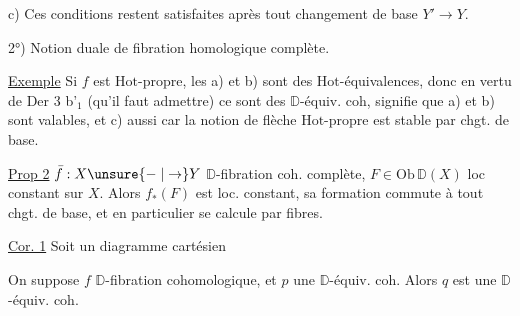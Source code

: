 
c) Ces conditions restent satisfaites après tout changement de base $Y'\to Y$.

2°) Notion duale de fibration homologique complète.

\uline{Exemple} Si $f$ est $\mathrm{Hot}$-propre, les  a) et b) sont des $\mathrm{Hot}$-équivalences, donc en vertu de Der 3 b'$_1$ (qu'il faut admettre) ce sont des $\mathbb D$-équiv. coh,  signifie que a) et b) sont valables, et c) aussi car la notion de flèche $\mathrm{Hot}$-propre est stable par chgt. de base.

\uline{Prop 2}  $\bar f:X\unsure{\relbar|\to}Y$ $\mathbb D$-fibration coh. complète, $F\in\mathrm{Ob}\,\mathbb D(X)$ loc constant sur $X$. Alors $f_*(F)$ est loc. constant, sa formation commute à tout chgt. de base, et en particulier se calcule  par fibres.


\uline{Cor. 1} Soit  un diagramme cartésien


On suppose $f$ $\mathbb D$-fibration cohomologique, et $p$ une $\mathbb D$-équiv. coh. Alors $q$ est une $\mathbb D$-équiv. coh.

